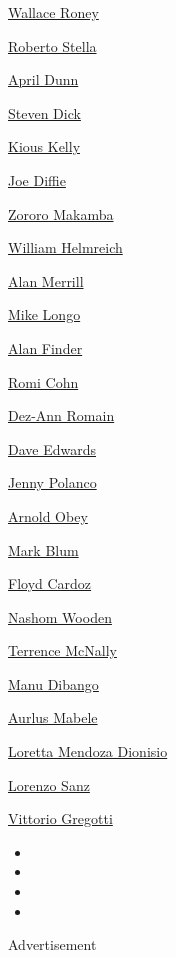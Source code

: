 \protect\hyperlink{wallace-roney}{Wallace Roney}

\protect\hyperlink{roberto-stella}{Roberto Stella}

\protect\hyperlink{april-dunn}{April Dunn}

\protect\hyperlink{steven-dick}{Steven Dick}

\protect\hyperlink{kious-kelly}{Kious Kelly}

\protect\hyperlink{joe-diffie}{Joe Diffie}

\protect\hyperlink{zororo-makamba}{Zororo Makamba}

\protect\hyperlink{william-helmreich}{William Helmreich}

\protect\hyperlink{alan-merrill}{Alan Merrill}

\protect\hyperlink{mike-longo}{Mike Longo}

\protect\hyperlink{alan-finder}{Alan Finder}

\protect\hyperlink{romi-cohn}{Romi Cohn}

\protect\hyperlink{dezann-romain}{Dez-Ann Romain}

\protect\hyperlink{dave-edwards}{Dave Edwards}

\protect\hyperlink{jenny-polanco}{Jenny Polanco}

\protect\hyperlink{arnold-obey}{Arnold Obey}

\protect\hyperlink{mark-blum}{Mark Blum}

\protect\hyperlink{floyd-cardoz}{Floyd Cardoz}

\protect\hyperlink{nashom-wooden}{Nashom Wooden}

\protect\hyperlink{terrence-mcnally}{Terrence McNally}

\protect\hyperlink{manu-dibango}{Manu Dibango}

\protect\hyperlink{aurlus-mabele}{Aurlus Mabele}

\protect\hyperlink{loretta-mendoza-dionisio}{Loretta Mendoza Dionisio}

\protect\hyperlink{lorenzo-sanz}{Lorenzo Sanz}

\protect\hyperlink{vittorio-gregotti}{Vittorio Gregotti}

\begin{itemize}
\item
\item
\item
\item
\end{itemize}

Advertisement

